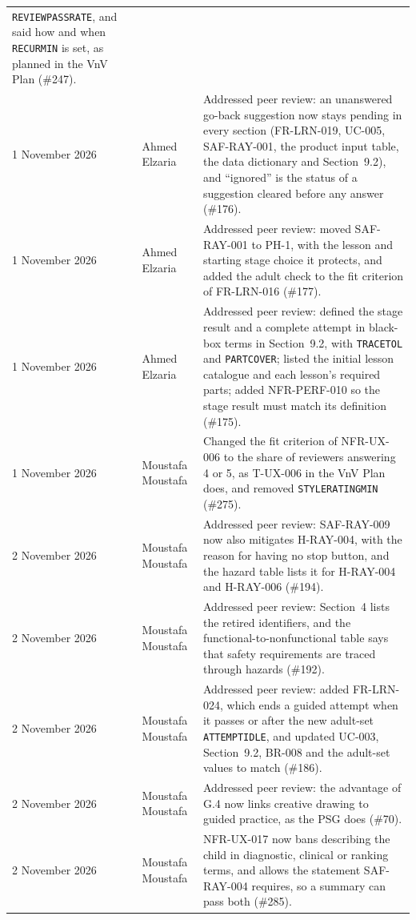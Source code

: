 \documentclass[12pt]{article}
\renewcommand{\_}{\textunderscore\allowbreak}%
\begin{document}
\begin{longtable}{@{}p{3cm}p{3cm}>{\raggedright\arraybackslash}p{\dimexpr\textwidth-6cm-4\tabcolsep\relax}@{}}
\texttt{REVIEW\_PASS\_RATE}, and said how and when \texttt{RECUR\_MIN} is set,
as planned in the VnV Plan (\#247).\\
1 November 2026 & Ahmed Elzaria & Addressed peer review: an unanswered go-back
suggestion now stays pending in every section (FR-LRN-019, UC-005,
SAF-RAY-001, the product input table, the data dictionary and Section~9.2),
and ``ignored'' is the status of a suggestion cleared before any answer
(\#176).\\
1 November 2026 & Ahmed Elzaria & Addressed peer review: moved SAF-RAY-001 to
PH-1, with the lesson and starting stage choice it protects, and added the
adult check to the fit criterion of FR-LRN-016 (\#177).\\
1 November 2026 & Ahmed Elzaria & Addressed peer review: defined the stage
result and a complete attempt in black-box terms in Section~9.2, with
\texttt{TRACE\_TOL} and \texttt{PART\_COVER}; listed the initial lesson
catalogue and each lesson's required parts; added NFR-PERF-010 so the stage
result must match its definition (\#175).\\
1 November 2026 & Moustafa Moustafa & Changed the fit criterion of NFR-UX-006 to
the share of reviewers answering 4 or 5, as T-UX-006 in the VnV Plan does, and
removed \texttt{STYLE\_RATING\_MIN} (\#275).\\
2 November 2026 & Moustafa Moustafa & Addressed peer review: SAF-RAY-009 now
also mitigates H-RAY-004, with the reason for having no stop button, and the
hazard table lists it for H-RAY-004 and H-RAY-006 (\#194).\\
2 November 2026 & Moustafa Moustafa & Addressed peer review: Section~4 lists the
retired identifiers, and the functional-to-nonfunctional table says that safety
requirements are traced through hazards (\#192).\\
2 November 2026 & Moustafa Moustafa & Addressed peer review: added FR-LRN-024,
which ends a guided attempt when it passes or after the new adult-set
\texttt{ATTEMPT\_IDLE}, and updated UC-003, Section~9.2, BR-008 and the
adult-set values to match (\#186).\\
2 November 2026 & Moustafa Moustafa & Addressed peer review: the advantage of
G.4 now links creative drawing to guided practice, as the PSG does (\#70).\\
2 November 2026 & Moustafa Moustafa & NFR-UX-017 now bans describing the child
in diagnostic, clinical or ranking terms, and allows the statement SAF-RAY-004
requires, so a summary can pass both (\#285).\\

\end{longtable}
\end{document}
